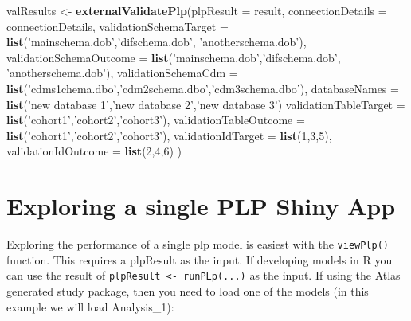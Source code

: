 \documentclass[11pt]{book}
\newenvironment{Shaded}{\begin{snugshade}}{\end{snugshade}}
\newcommand{\KeywordTok}[1]{\textcolor[rgb]{0.13,0.29,0.53}{\textbf{#1}}}
\newcommand{\DataTypeTok}[1]{\textcolor[rgb]{0.13,0.29,0.53}{#1}}
\newcommand{\DecValTok}[1]{\textcolor[rgb]{0.00,0.00,0.81}{#1}}
\newcommand{\StringTok}[1]{\textcolor[rgb]{0.31,0.60,0.02}{#1}}
\newcommand{\NormalTok}[1]{#1}
\begin{document}
\begin{Shaded}
\begin{Highlighting}[]
\NormalTok{valResults <-}\StringTok{ }\KeywordTok{externalValidatePlp}\NormalTok{(}\DataTypeTok{plpResult =}\NormalTok{ result, }
                    \DataTypeTok{connectionDetails =}\NormalTok{ connectionDetails,}
                    \DataTypeTok{validationSchemaTarget =} \KeywordTok{list}\NormalTok{(}\StringTok{'mainschema.dob'}\NormalTok{,}\StringTok{'difschema.dob'}\NormalTok{, }\StringTok{'anotherschema.dob'}\NormalTok{),}
                    \DataTypeTok{validationSchemaOutcome =} \KeywordTok{list}\NormalTok{(}\StringTok{'mainschema.dob'}\NormalTok{,}\StringTok{'difschema.dob'}\NormalTok{, }\StringTok{'anotherschema.dob'}\NormalTok{),}
                    \DataTypeTok{validationSchemaCdm =} \KeywordTok{list}\NormalTok{(}\StringTok{'cdms1chema.dbo'}\NormalTok{,}\StringTok{'cdm2schema.dbo'}\NormalTok{,}\StringTok{'cdm3schema.dbo'}\NormalTok{),}
                    \DataTypeTok{databaseNames =} \KeywordTok{list}\NormalTok{(}\StringTok{'new database 1'}\NormalTok{,}\StringTok{'new database 2'}\NormalTok{,}\StringTok{'new database 3'}\NormalTok{)}
                    \DataTypeTok{validationTableTarget =} \KeywordTok{list}\NormalTok{(}\StringTok{'cohort1'}\NormalTok{,}\StringTok{'cohort2'}\NormalTok{,}\StringTok{'cohort3'}\NormalTok{),}
                    \DataTypeTok{validationTableOutcome =} \KeywordTok{list}\NormalTok{(}\StringTok{'cohort1'}\NormalTok{,}\StringTok{'cohort2'}\NormalTok{,}\StringTok{'cohort3'}\NormalTok{),}
                    \DataTypeTok{validationIdTarget =} \KeywordTok{list}\NormalTok{(}\DecValTok{1}\NormalTok{,}\DecValTok{3}\NormalTok{,}\DecValTok{5}\NormalTok{),}
                    \DataTypeTok{validationIdOutcome =} \KeywordTok{list}\NormalTok{(}\DecValTok{2}\NormalTok{,}\DecValTok{4}\NormalTok{,}\DecValTok{6}\NormalTok{)}
\NormalTok{                    )}
\end{Highlighting}
\end{Shaded}

\newpage

\section{Exploring a single PLP Shiny
App}\label{exploring-a-single-plp-shiny-app}

Exploring the performance of a single plp model is easiest with the
\texttt{viewPlp()} function. This requires a plpResult as the input. If
developing models in R you can use the result of
\texttt{plpResult\ \textless{}-\ runPLp(...)} as the input. If using the
Atlas generated study package, then you need to load one of the models
(in this example we will load Analysis\_1):
\end{document}
